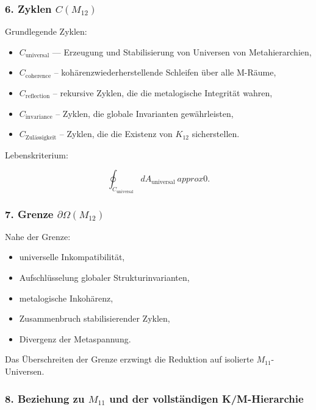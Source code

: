 \subsubsection*{6. Zyklen $C(M_{12})$}

Grundlegende Zyklen:

\begin{itemize}
    \item $C_{\mathrm{universal}}$ — Erzeugung und Stabilisierung von Universen von Metahierarchien,
    \item $C_{\mathrm{coherence}}$ – kohärenzwiederherstellende Schleifen über alle M-Räume,
    \item $C_{\mathrm{reflection}}$ – rekursive Zyklen, die die metalogische Integrität wahren,
    \item $C_{\mathrm{invariance}}$ – Zyklen, die globale Invarianten gewährleisten,
    \item $C_{\mathrm{Zulässigkeit}}$ – Zyklen, die die Existenz von $K_{12}$ sicherstellen.
\end{itemize}

Lebenskriterium:

\[
\oint_{C_{\mathrm{universal}}} dA_{\mathrm{universal}} \ approx 0.
\]

\subsubsection*{7. Grenze $\partial\Omega(M_{12})$}

Nahe der Grenze:

\begin{itemize}
    \item universelle Inkompatibilität,
    \item Aufschlüsselung globaler Strukturinvarianten,
    \item metalogische Inkohärenz,
    \item Zusammenbruch stabilisierender Zyklen,
    \item Divergenz der Metaspannung.
\end{itemize}

Das Überschreiten der Grenze erzwingt die Reduktion auf isolierte $M_{11}$-Universen.

\subsubsection*{8. Beziehung zu $M_{11}$ und der vollständigen K/M-Hierarchie}


